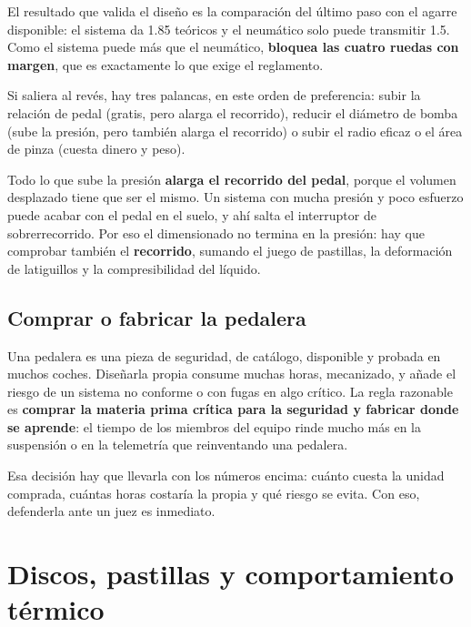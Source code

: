 \begin{clave}
El resultado que valida el diseño es la comparación del último paso con el
agarre disponible: el sistema da \SI{1.85}{\gacc} teóricos y el neumático solo
puede transmitir \SI{1.5}{\gacc}. Como el sistema puede más que el neumático,
\textbf{bloquea las cuatro ruedas con margen}, que es exactamente lo que exige
el reglamento.

Si saliera al revés, hay tres palancas, en este orden de preferencia: subir la
relación de pedal (gratis, pero alarga el recorrido), reducir el diámetro de
bomba (sube la presión, pero también alarga el recorrido) o subir el radio
eficaz o el área de pinza (cuesta dinero y peso).
\end{clave}

\begin{ojo}
Todo lo que sube la presión \textbf{alarga el recorrido del pedal}, porque el
volumen desplazado tiene que ser el mismo. Un sistema con mucha presión y poco
esfuerzo puede acabar con el pedal en el suelo, y ahí salta el interruptor de
sobrerrecorrido. Por eso el dimensionado no termina en la presión: hay que
comprobar también el \textbf{recorrido}, sumando el juego de pastillas, la
deformación de latiguillos y la compresibilidad del líquido.
\end{ojo}

\subsection{Comprar o fabricar la pedalera}

\begin{clave}
Una pedalera es una pieza de seguridad, de catálogo, disponible y probada en
muchos coches. Diseñarla propia consume muchas horas, mecanizado, y añade el
riesgo de un sistema no conforme o con fugas en algo crítico. La regla
razonable es \textbf{comprar la materia prima crítica para la seguridad y
fabricar donde se aprende}: el tiempo de los miembros del equipo rinde mucho más
en la suspensión o en la telemetría que reinventando una pedalera.

Esa decisión hay que llevarla con los números encima: cuánto cuesta la unidad
comprada, cuántas horas costaría la propia y qué riesgo se evita. Con eso,
defenderla ante un juez es inmediato.
\end{clave}

\section{Discos, pastillas y comportamiento térmico}
\label{sec:frenos:04}

